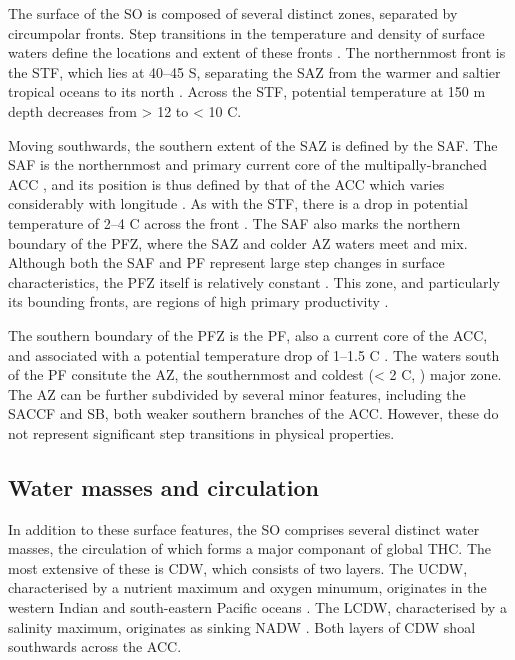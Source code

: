 The surface of the \ac{SO} is composed of several distinct zones, separated by circumpolar fronts.
Step transitions in the temperature and density of surface waters define the locations and extent of these fronts \cite{Sokolov:2002tc,Orsi:1995va}.
The northernmost front is the \ac{STF}, which lies at \textapprox{} 40--45\textdegree{} S, separating the \ac{SAZ} from the warmer and saltier tropical oceans to its north \cite{Sokolov:2002tc}.
Across the \ac{STF}, potential temperature at 150 m depth decreases from \textgreater{} 12 to \textless{} 10 \textdegree{}C.

Moving southwards, the southern extent of the \ac{SAZ} is defined by the \ac{SAF}.
The \ac{SAF} is the northernmost and primary current core of the multipally-branched \ac{ACC} \cite{Sokolov:2009wp}, and its position is thus defined by that of the \ac{ACC} which varies considerably with longitude \cite{Moore:1999to}.
As with the \ac{STF}, there is a drop in potential temperature of 2--4 \textdegree{}C across the front \cite{Sokolov:2002tc}.
The \ac{SAF} also marks the northern boundary of the \ac{PFZ}, where the \ac{SAZ} and colder \ac{AZ} waters meet and mix.
Although both the \ac{SAF} and \ac{PF} represent large step changes in surface characteristics, the \ac{PFZ} itself is relatively constant \cite{WhitworthIII:1987ky}.
This zone, and particularly its bounding fronts, are regions of high primary productivity \citep[e.g.][]{Laubscher:1993hu,Abell:2005ji}.

The southern boundary of the \ac{PFZ} is the \ac{PF}, also a current core of the \ac{ACC}, and associated with a potential temperature drop of \textapprox{} 1--1.5 \textdegree{}C \cite{Moore:1999to}.
The waters south of the \ac{PF} consitute the \ac{AZ}, the southernmost and coldest (\textless{} 2 \textdegree{}C, \citet{Sokolov:2002tc}) major zone.
The \ac{AZ} can be further subdivided by several minor features, including the \ac{SACCF} and \ac{SB}, both weaker southern branches of the \ac{ACC}.
However, these do not represent significant step transitions in physical properties.

\subsection{Water masses and circulation}

In addition to these surface features, the \ac{SO} comprises several distinct water masses, the circulation of which forms a major componant of global \ac{THC}.
The most extensive of these is \ac{CDW}, which consists of two layers.
The \ac{UCDW}, characterised by a nutrient maximum and oxygen minumum, originates in the western Indian and south-eastern Pacific oceans \cite{Orsi:1995va}.
The \ac{LCDW}, characterised by a salinity maximum, originates as sinking \ac{NADW} \cite{WhitworthIII:1987ky}.
Both layers of \ac{CDW} shoal southwards across the \ac{ACC}.

